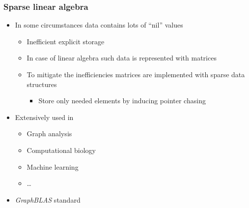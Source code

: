 \documentclass[xcolor=table]{beamer}
\begin{document}
  \begin{frame}[fragile]
    \frametitle{Sparse linear algebra}
    \begin{itemize}
      \item In some circumstances data contains lots of ``nil'' values
      \vfill
      \begin{itemize}
      \vfill
          \item Inefficient explicit storage 
          \vfill
          \item In case of linear algebra such data is represented with matrices
          \vfill
          \item To mitigate the inefficiencies matrices are implemented with sparse data structures
          \vfill
          \begin{itemize}
              \item Store only needed elements by inducing pointer chasing  
          \end{itemize}
      \end{itemize}
      \vfill
    \item Extensively used in
      \begin{itemize}
      \vfill
          \item Graph analysis
          \vfill
          \item Computational biology
          \vfill
          \item Machine learning
          \vfill
          \item \ldots
      \end{itemize}
      \vfill
      \item \emph{GraphBLAS} standard 
    \end{itemize}
  \end{frame}
\end{document}
